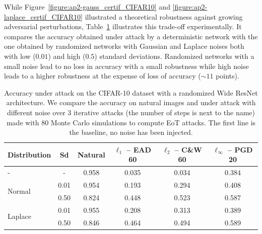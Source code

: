 While Figure~\ref{figure:ap2-gauss_certif_CIFAR10} and \ref{figure:ap2-laplace_certif_CIFAR10} illustrated a theoretical robustness against growing adversarial perturbations, Table~\ref{table:ap2-accuracy_under_attack} illustrates this trade-off experimentally.
It compares the accuracy obtained under attack by a deterministic network with the one obtained by randomized networks with Gaussian and Laplace noises both with low ($0.01$) and high ($0.5$) standard deviations.
Randomized networks with a small noise lead to no loss in accuracy with a small robustness while high noise leads to a higher robustness at the expense of loss of accuracy ($\sim11$ points). 

\begin{table}[t]
  \centering
  \caption{Accuracy under attack on the CIFAR-10 dataset with a randomized Wide ResNet architecture. We compare the accuracy on natural images and under attack with different noise over 3 iterative attacks (the number of steps is next to the name) made with 80 Monte Carlo simulations to compute EoT attacks. The first line is the baseline, no noise has been injected.}
    \begin{tabular}{lccccc}
    \toprule
    \textbf{Distribution} & \textbf{Sd} & \textbf{Natural} & \textbf{$\ell_1$ -- EAD 60} & \textbf{$\ell_2$ -- C\&W 60} & \textbf{$\ell_\infty$ -- PGD 20} \\
    \midrule
    - & - & 0.958 & 0.035 & 0.034 & 0.384 \\
    \midrule
    \multirow{2}[0]{*}{Normal} & 0.01 & 0.954 & 0.193 & 0.294 & 0.408 \\
          & 0.50 & 0.824 & 0.448 & 0.523 & 0.587 \\
    \midrule
    \multirow{2}[0]{*}{Laplace} & 0.01 & 0.955 & 0.208 & 0.313 & 0.389 \\
          & 0.50 & 0.846 & 0.464 & 0.494 & 0.589 \\
    \bottomrule
    \end{tabular}%
  \label{table:ap2-accuracy_under_attack}%
\end{table}%

